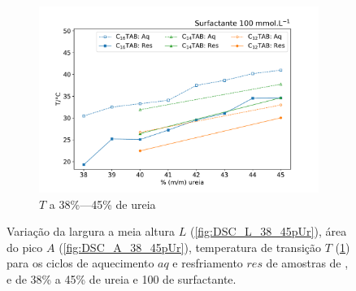 \begin{figure}[h]
		\hspace{4cm} \begin{subfigure}[t]{0.5\textwidth}
			\includegraphics[width=\textwidth]{./imagens/dsc/T_100mM_aq_res}
			\caption{\(T\) a 38\%---45\% de ureia}
			\label{fig:DSC_T_38_45pUr}
		\end{subfigure}
		
		\caption{Variação da largura a meia altura \(L\) (\ref{fig:DSC_L_38_45pUr}), área do pico \(A\) (\ref{fig:DSC_A_38_45pUr}), temperatura de transição \(T\) (\ref{fig:DSC_T_38_45pUr}) para os ciclos de aquecimento \(aq\) e resfriamento \(res\) de amostras de \CTAB, \DTAB{} e \TTAB{} de 38\% a 45\% de ureia e 100 \mM{} de surfactante.}
		\label{fig:DSC_propriedades_Ur_38_45}
	\end{figure}
		
%		
	
